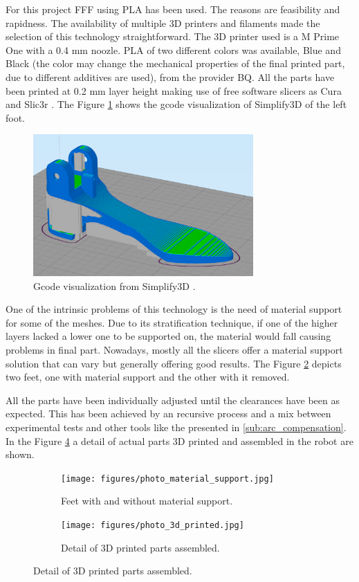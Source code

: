 For this project FFF using PLA has been used.
The reasons are feasibility and rapidness.
The availability of multiple 3D printers and filaments made the selection of this technology straightforward.
The 3D printer used is a M Prime One \cite{m_prime_one} with a 0.4 mm noozle.
PLA of two different colors was available, Blue and Black (the color may change the mechanical properties of the final printed part, due to different additives are used), from the provider BQ.
All the parts have been printed at 0.2 mm layer height making use of free software slicers as Cura \cite{cura} and Slic3r \cite{slic3r}.
The Figure \ref{fig:3d_printing_gcode} shows the gcode visualization of Simplify3D \cite{simplify3d} of the left foot.
\begin{figure}[htb]
  \centering
  \includegraphics[width=0.75\textwidth]{figures/3d_printing_gcode}
  \caption{Gcode visualization from Simplify3D \cite{simplify3d}.}
  \label{fig:3d_printing_gcode}
\end{figure}
One of the intrinsic problems of this technology is the need of material support for some of the meshes.
Due to its stratification technique, if one of the higher layers lacked a lower one to be supported on, the material would fall causing problems in final part.
Nowadays, mostly all the slicers offer a material support solution that can vary but generally offering good results.
The Figure \ref{fig:photo_material_support} depicts two feet, one with material support and the other with it removed.

All the parts have been individually adjusted until the clearances have been as expected.
This has been achieved by an recursive process and a mix between experimental tests and other tools like the presented in \ref{sub:arc_compensation}.
In the Figure \ref{fig:photo_3d_printed} a detail of actual parts 3D printed and assembled in the robot are shown.

\begin{figure}[ht]
    \centering
    \begin{subfigure}[b]{0.49\textwidth}
        \texttt{[image: figures/photo\_material\_support.jpg]}
        \caption{Feet with and without material support.}
        \label{fig:photo_material_support}
    \end{subfigure}
    \begin{subfigure}[b]{0.49\textwidth}
        \texttt{[image: figures/photo\_3d\_printed.jpg]}
        \caption{Detail of 3D printed parts assembled.}
        \label{fig:photo_3d_printed}
    \end{subfigure}
\end{figure}


